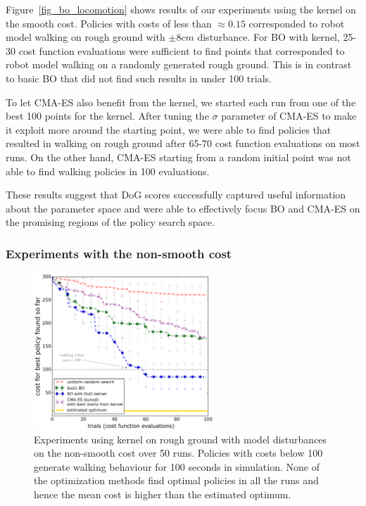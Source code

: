 Figure~\ref{fig_bo_locomotion} shows results of our experiments using the \dogkernel kernel on the smooth cost.
Policies with costs of less than $\approx\!\!0.15$ corresponded to robot model walking on rough ground with $\pm 8 cm$ disturbance.
For BO with \dogkernel kernel, 25-30 cost function evaluations were sufficient to find points that corresponded to robot model walking on a randomly generated rough ground. This is in contrast to basic BO that did not find such results in under 100 trials. 

To let CMA-ES also benefit from the kernel, we started each run from one of the best 100 points for the \dogkernel kernel. After tuning the $\sigma$ parameter of CMA-ES to make it exploit more around the starting point, we were able to find policies that resulted in walking on rough ground after 65-70 cost function evaluations on most runs. On the other hand, \mbox{CMA-ES} starting from a random initial point was not able to find walking policies in 100 evaluations.

These results suggest that DoG scores successfully captured useful information about the parameter space and were able to effectively focus BO and CMA-ES on the promising regions of the policy search space. 

\subsubsection{Experiments with the non-smooth cost}

\begin{figure}[t]
\centering
\includegraphics[width=0.6\textwidth]{img/rnd_bo_bo_covLoc_cma_rough6_disturb_nonsmooth_cost.png}
\caption{Experiments using \dogkernel kernel on rough ground with model disturbances on the non-smooth cost over 50 runs. Policies with costs below 100 generate walking behaviour for 100 seconds in simulation. None of the optimization methods find optimal policies in all the runs and hence the mean cost is higher than the estimated optimum.}
\label{fig_bo_locomotion_non_smooth}
\end{figure}

